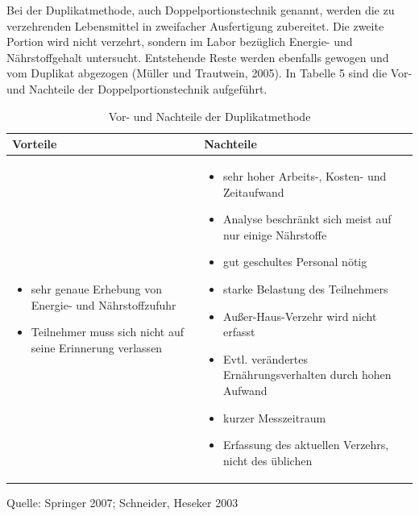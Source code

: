 Bei der Duplikatmethode, auch Doppelportionstechnik genannt, werden die zu verzehrenden Lebensmittel in zweifacher Ausfertigung zubereitet. Die zweite Portion wird nicht verzehrt, sondern im Labor bezüglich Energie- und Nährstoffgehalt untersucht. Entstehende Reste werden ebenfalls gewogen und vom Duplikat abgezogen (Müller und Trautwein, 2005). In Tabelle 5 sind die Vor- und Nachteile der Doppelportionstechnik aufgeführt.


\begin{table}[!h]
\begin{flushleft}
\caption{Vor- und Nachteile der Duplikatmethode }
\end{flushleft}
\begin{tabular}{p{7cm} p{7cm}}
Vorteile & Nachteile \\
\hline

\begin{itemize}
\item sehr genaue Erhebung von Energie- und Nährstoffzufuhr
\item Teilnehmer muss sich nicht auf seine Erinnerung verlassen

\end{itemize}

&

\begin{itemize}
\item sehr hoher Arbeits-, Kosten- und Zeitaufwand
\item Analyse beschränkt sich meist auf nur einige Nährstoffe
\item gut geschultes Personal nötig
\item starke Belastung des Teilnehmers
\item Außer-Haus-Verzehr wird nicht erfasst
\item Evtl. verändertes Ernährungsverhalten durch hohen Aufwand
\item kurzer Messzeitraum
\item Erfassung des aktuellen Verzehrs, nicht des üblichen




\end{itemize}
\end{tabular}
\label{tab:Verzehrsprotokoll2}
Quelle: Springer 2007; Schneider, Heseker 2003
\end{table}

